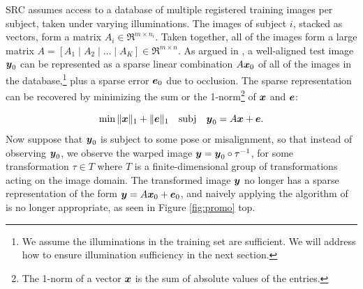 SRC assumes access to a database of multiple registered training images per subject, taken under varying illuminations. The images of subject $i$, stacked as vectors, form a matrix $A_i \in \Re^{m \times n_i}$. Taken together, all of the images form a large matrix $A = [ A_1 \mid A_2 \mid \dots \mid A_K ] \in \Re^{m \times n}$. As argued in \cite{Wright2009-PAMI}, a well-aligned test image ${\boldsymbol{y}}_0$ can be represented as a sparse linear combination $A {\boldsymbol{x}}_0$ of all of the images in the database,\footnote{We assume the illuminations in the training set are sufficient. We will address how to ensure illumination sufficiency in the next section.} plus a sparse error $\boldsymbol{e}_0$ due to occlusion. The sparse representation can be recovered by minimizing the sum or the 1-norm\footnote{The 1-norm of a vector ${\boldsymbol{x}}$ is the sum of absolute values of the entries.} of ${\boldsymbol{x}}$ and $\boldsymbol{e}$:\vspace{0mm}

\begin{equation}
\min \| \x \|_1 + \| \e\|_1 \quad \subj \quad \y_0 = A \x + \e.
\label{eqn:robust-l1}\vspace{0mm}
\end{equation}
Now suppose that ${\boldsymbol{y}}_0$ is subject to some pose or misalignment, so that instead of observing ${\boldsymbol{y}}_0$, we observe the warped image ${\boldsymbol{y}} = {\boldsymbol{y}}_0 \circ \tau^{-1}$, for some transformation $\tau \in T$ where $T$ is a finite-dimensional group of transformations acting on the image domain.  The transformed image ${\boldsymbol{y}}$ no longer has a sparse representation of the form ${\boldsymbol{y}} = A {\boldsymbol{x}}_0 + \boldsymbol{e}_0$, and naively applying the algorithm of \cite{Wright2009-PAMI} is no longer appropriate, as seen in Figure \ref{fig:promo} top. \vspace{0mm}

